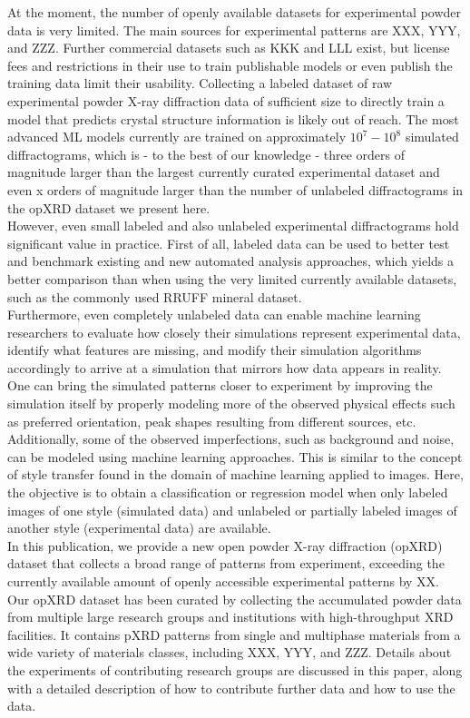 At the moment, the number of openly available datasets for experimental powder data is very limited. The main sources for experimental patterns are XXX, YYY, and ZZZ. Further commercial datasets such as KKK and LLL exist, but license fees and restrictions in their use to train publishable models or even publish the training data limit their usability. Collecting a labeled dataset of raw experimental powder X-ray diffraction data of sufficient size to directly train a model that predicts crystal structure information is likely out of reach. The most advanced ML models currently are trained on approximately $10^7 - 10^8$ simulated diffractograms, which is - to the best of our knowledge - three orders of magnitude larger than the largest currently curated experimental dataset and even x orders of magnitude larger than the number of unlabeled diffractograms in the opXRD dataset we present here. \\

However, even small labeled and also unlabeled experimental diffractograms hold significant value in practice. First of all, labeled data can be used to better test and benchmark existing and new automated analysis approaches, which yields a better comparison than when using the very limited currently available datasets, such as the commonly used RRUFF mineral dataset. \cite{Armbruster2015} \\

Furthermore, even completely unlabeled data can enable machine learning researchers to evaluate how closely their simulations represent experimental data, identify what features are missing, and modify their simulation algorithms accordingly to arrive at a simulation that mirrors how data appears in reality.
One can bring the simulated patterns closer to experiment by improving the simulation itself by properly modeling more of the observed physical effects such as preferred orientation, peak shapes resulting from different sources, etc.
Additionally, some of the observed imperfections, such as background and noise, can be modeled using machine learning approaches. This is similar to the concept of style transfer\cite{Gatys2016, Ganin2015} found in the domain of machine learning applied to images. Here, the objective is to obtain a classification or regression model when only labeled images of one style (simulated data) and unlabeled or partially labeled images of another style (experimental data) are available. \\

In this publication, we provide a new open powder X-ray diffraction (opXRD) dataset that collects a broad range of patterns from experiment, exceeding the currently available amount of openly accessible experimental patterns by XX.
Our opXRD dataset has been curated by collecting the accumulated powder data from multiple large research groups and institutions with high-throughput XRD facilities. It contains pXRD patterns from single and multiphase materials from a wide variety of materials classes, including XXX, YYY, and ZZZ. Details about the experiments of contributing research groups are discussed in this paper, along with a detailed description of how to contribute further data and how to use the data. \\

